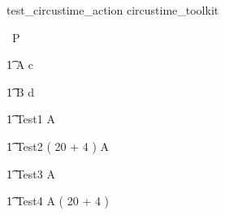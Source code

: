 
\begin{zsection}
   \SECTION test\_circustime\_action \parents circustime\_toolkit
\end{zsection}


\begin{circus}
    \circprocess\ P \circdef \circbegin \\
\end{circus}

\begin{circusaction}
    	\t1 A \circdef c \then \Skip \\
\end{circusaction}

\begin{circusaction}
        \t1 B \circdef d \then \Skip \\
\end{circusaction}



\begin{circusaction}
   \t1 Test1  \circstartby A  \\
\end{circusaction}


\begin{circusaction}
   \t1 Test2 \circdef  ( 20 + 4 )  \circstartby A  \\
\end{circusaction}


\begin{circusaction}
   \t1 Test3 \circdef  A   \\
\end{circusaction}


\begin{circusaction}
   \t1 Test4 \circdef  A \circendby ( 20 + 4 )  \\
\end{circusaction}


